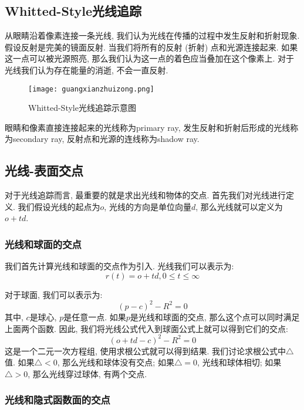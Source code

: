 \subsection{Whitted-Style光线追踪}
从眼睛沿着像素连接一条光线, 我们认为光线在传播的过程中发生反射和折射现象. 假设反射是完美的镜面反射. 当我们将所有的反射 (折射) 点和光源连接起来. 如果这一点可以被光源照亮, 那么我们认为这一点的着色应当叠加在这个像素上. 对于光线我们认为存在能量的消逝, 不会一直反射. 

\begin{figure}[H]
	\centering
	\texttt{[image: guangxianzhuizong.png]}
	\caption{Whitted-Style光线追踪示意图}
	\label{fig:gxzz}
\end{figure}
眼睛和像素直接连接起来的光线称为primary ray, 发生反射和折射后形成的光线称为secondary ray, 反射点和光源的连线称为shadow ray. 

\subsection{光线-表面交点}
对于光线追踪而言, 最重要的就是求出光线和物体的交点. 首先我们对光线进行定义. 我们假设光线的起点为$o$, 光线的方向是单位向量$d$, 那么光线就可以定义为$o+td$. 

\subsubsection{光线和球面的交点}

我们首先计算光线和球面的交点作为引入. 光线我们可以表示为: 
\begin{equation}
	r(t)=o+td, 0\le t \le \infty
\end{equation}

对于球面, 我们可以表示为: 
\begin{equation}
	(p-c)^2-R^2=0
\end{equation}其中, $c$是球心, $p$是任意一点. 如果$p$是光线和球面的交点, 那么这个点可以同时满足上面两个函数. 因此, 我们将光线公式代入到球面公式上就可以得到它们的交点: 
\begin{equation}
	(o+td-c)^2-R^2=0
\end{equation}
这是一个二元一次方程组, 使用求根公式就可以得到结果. 我们讨论求根公式中$\triangle$值. 如果$\triangle < 0$, 那么光线和球体没有交点; 如果$\triangle = 0$, 光线和球体相切; 如果$\triangle > 0$, 那么光线穿过球体, 有两个交点. 

\subsubsection{光线和隐式函数面的交点}

